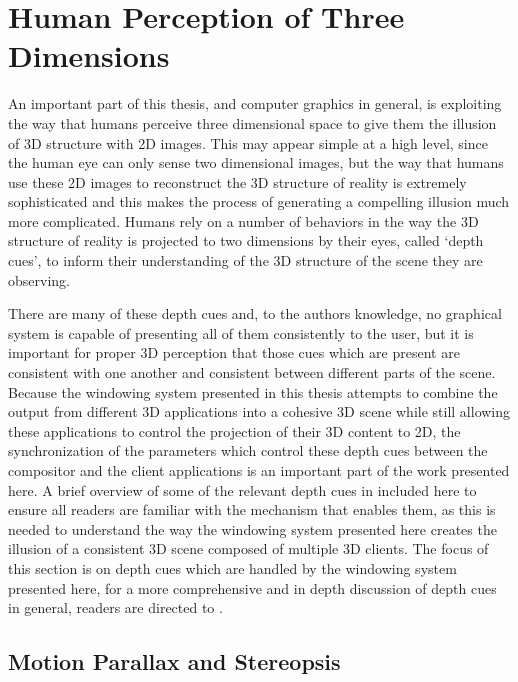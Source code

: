 \section{Human Perception of Three Dimensions}

An important part of this thesis, and computer graphics in general, is exploiting the way that humans perceive three dimensional space to give them the illusion of 3D structure with 2D images. This may appear simple at a high level, since the human eye can only sense two dimensional images, but the way that humans use these 2D images to reconstruct the 3D structure of reality is extremely sophisticated and this makes the process of generating a compelling illusion much more complicated. Humans rely on a number of behaviors in the way the 3D structure of reality is projected to two dimensions by their eyes, called ‘depth cues’, to inform their understanding of the 3D structure of the scene they are observing.
	
There are many of these depth cues and, to the authors knowledge, no graphical system is capable of presenting all of them consistently to the user, but it is important for proper 3D perception that those cues which are present are consistent with one another and consistent between different parts of the scene. Because the windowing system presented in this thesis attempts to combine the output from different 3D applications into a cohesive 3D scene while still allowing these applications to control the projection of their 3D content to 2D, the synchronization of the parameters which control these depth cues between the compositor and the client applications is an important part of the work presented here. A brief overview of some of the relevant depth cues in included here to ensure all readers are familiar with the mechanism that enables them, as this is needed to understand the way the windowing system presented here creates the illusion of a consistent 3D scene composed of multiple 3D clients. The focus of this section is on depth cues which are handled by the windowing system presented here, for a more comprehensive and in depth discussion of depth cues in general, readers are directed to \cite{depth-cues}.

\subsection{Motion Parallax and Stereopsis}

